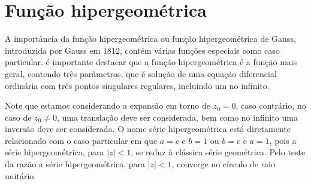 




\section{Função hipergeométrica}

A importância da função hipergeométrica ou função hipergeométrica de Gauss, introduzida por Gauss em 1812, contém várias funções especiais como caso particular. é importante destacar que a função hipergeométrica é a função mais geral, contendo três parâmetros, que é solução de uma equação diferencial ordinária com três pontos singulares regulares, incluindo um no infinito.



Note que estamos considerando a expansão em torno de $z_0 = 0$, caso contrário, no caso de $z_0 \neq 0$, uma translação deve ser considerada, bem como no infinito uma inversão deve ser considerada. O nome série hipergeométrica está diretamente relacionado com o caso particular em que $a = c$ e $b = 1$ ou $b = c$ e $a = 1$, pois a série hipergeométrica, para $|z| < 1$, se reduz à clássica série geométrica. Pelo teste da razão a série hipergeométrica, para $|z| < 1$, converge no círculo de raio unitário.


